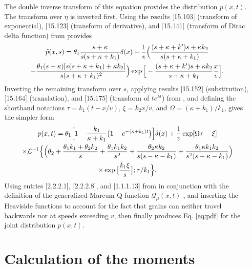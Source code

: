 The double inverse transform of this equation provides the distribution $p(x,t)$.
The transform over $\eta$ is inverted first.
Using the results [15.103] (transform of exponential), [15.123] (transform of derivative), and [15.141] (transform of Dirac delta function) from \citet{Arfken1985} provides 
\begin{multline} \tilde{p}(x,s) = \theta_1 \frac{s+\kappa}{s(s+\kappa + k_1)}\delta(x) + \frac{1}{v} \Big(\frac{(s+\kappa+k')s+\kappa k_2}{s(s+\kappa+k_1)} \\- \frac{\theta_1(s+\kappa)[s(s+\kappa+k_1)+\kappa k_2]}{s(s+\kappa+k_1)^2}\Big)
	\exp\Big[-\frac{(s+\kappa+k')s+\kappa k_2}{s+\kappa+k_1}\frac{x}{v}\Big].\end{multline}
Inverting the remaining transform over $s$, applying results [15.152] (substitution), [15.164] (translation), and [15.175] (transform of $te^{kt}$) from \citet{Arfken1985}, and defining the shorthand notations $\tau = k_1(t-x/v)$, $\xi = k_2 x/v$, and $\Omega = (\kappa + k_1)/k_1$, gives the simpler form 
\begin{multline}
	p(x,t) = \theta_1\Big[1-\frac{k_1}{\kappa + k_1}\big(1-e^{-(\kappa + k_1)t}\big)\Big]\delta(x) + \frac{1}{v}\exp[\Omega \tau - \xi]\\
	\times \mathcal{L}^{-1}\Big\{\Big( \theta_2 + \frac{\theta_1k_1+\theta_2 k_2}{s}+\frac{\theta_1k_1k_2}{s^2} + \frac{\theta_2\kappa k_2}{s(s-\kappa-k_1)} + \frac{\theta_1\kappa k_1 k_2}{s^2(s-\kappa-k_1)}\Big)\\
	\times\exp\big[\frac{k_1 \xi}{s}\big];\tau/k_1\Big\}.
\end{multline}
Using entries [2.2.2.1], [2.2.2.8], and [1.1.1.13] from \citet{Prudnikov1992a} in conjunction with the definition of the generalized Marcum Q-function $ \mathcal{Q}_\mu(x,t)$ \citep{Temme1996}, and inserting the Heaviside functions to account for the fact that grains can neither travel backwards nor at speeds exceeding $v$, then finally produces Eq. \ref{eq:pdf} for the joint distribution $p(x,t)$.

\section{Calculation of the moments}
\label{sec:appendixB}

